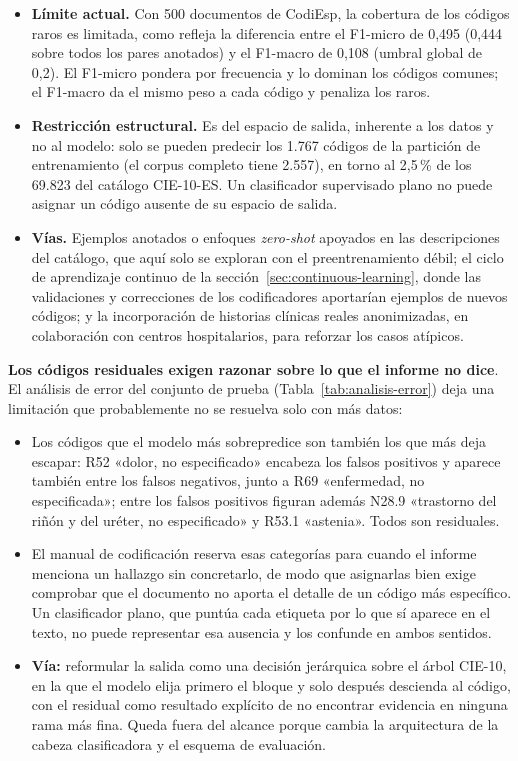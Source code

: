 \begin{itemize}
 \item \textbf{Límite actual.} Con 500 documentos de CodiEsp, la cobertura de los códigos raros es limitada, como refleja la diferencia entre el F1-micro de 0,495 (0,444 sobre todos los pares anotados) y el F1-macro de 0,108 (umbral global de 0,2). El F1-micro pondera por frecuencia y lo dominan los códigos comunes; el F1-macro da el mismo peso a cada código y penaliza los raros.
 \item \textbf{Restricción estructural.} Es del espacio de salida, inherente a los datos y no al modelo: solo se pueden predecir los 1.767 códigos de la partición de entrenamiento (el corpus completo tiene 2.557), en torno al 2,5\,\% de los 69.823 del catálogo CIE-10-ES. Un clasificador supervisado plano no puede asignar un código ausente de su espacio de salida.
 \item \textbf{Vías.} Ejemplos anotados o enfoques \emph{zero-shot} apoyados en las descripciones del catálogo, que aquí solo se exploran con el preentrenamiento débil; el ciclo de aprendizaje continuo de la sección~\ref{sec:continuous-learning}, donde las validaciones y correcciones de los codificadores aportarían ejemplos de nuevos códigos; y la incorporación de historias clínicas reales anonimizadas, en colaboración con centros hospitalarios, para reforzar los casos atípicos.
\end{itemize}

\textbf{Los códigos residuales exigen razonar sobre lo que el informe no dice}. El análisis de error del conjunto de prueba (Tabla~\ref{tab:analisis-error}) deja una limitación que probablemente no se resuelva solo con más datos:

\begin{itemize}
 \item Los códigos que el modelo más sobrepredice son también los que más deja escapar: R52 «dolor, no especificado» encabeza los falsos positivos y aparece también entre los falsos negativos, junto a R69 «enfermedad, no especificada»; entre los falsos positivos figuran además N28.9 «trastorno del riñón y del uréter, no especificado» y R53.1 «astenia». Todos son residuales.
 \item El manual de codificación reserva esas categorías para cuando el informe menciona un hallazgo sin concretarlo, de modo que asignarlas bien exige comprobar que el documento no aporta el detalle de un código más específico. Un clasificador plano, que puntúa cada etiqueta por lo que sí aparece en el texto, no puede representar esa ausencia y los confunde en ambos sentidos.
 \item \textbf{Vía:} reformular la salida como una decisión jerárquica sobre el árbol CIE-10, en la que el modelo elija primero el bloque y solo después descienda al código, con el residual como resultado explícito de no encontrar evidencia en ninguna rama más fina. Queda fuera del alcance porque cambia la arquitectura de la cabeza clasificadora y el esquema de evaluación.
\end{itemize}

